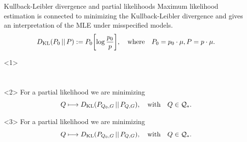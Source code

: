 \documentclass[smaller]{beamer}\usepackage{listings}
\begin{document}
\begin{frame}[label={sec:org1d43bb0}]{Kullback-Leibler divergence and partial likelihoods}
\small Maximum likelihood estimation is connected to minimizing the Kullback-Leibler
divergence and gives an interpretation of the MLE under misspecified models.
\begin{equation*}
  D_{\mathrm{KL}}(P_0 \, || \, P) := P_0
  {\left[
    \log \frac{p_0}{p}
  \right]},
  \quad \text{where} \quad
  P_0 = p_0 \cdot \mu,   P = p \cdot \mu.
\end{equation*}

\begin{onlyenv}<1>
\phantom{For a partial likelihood we are minimizing}
\begin{equation*}
 \phantom{  Q \longmapsto \KL(P_{Q_0,G} \, || \, P_{Q,G}), \quad \text{with} \quad Q \in \mathcal{Q}_*.}
\end{equation*}

\vfill

\end{onlyenv}

\begin{onlyenv}<2>
For a partial likelihood we are minimizing
\begin{equation*}
  Q \longmapsto D_{\mathrm{KL}}(P_{Q_0,G} \, || \, P_{Q,G}),
  \quad \text{with} \quad Q \in \mathcal{Q}_*.
\end{equation*}

\vfill

\end{onlyenv}

\begin{onlyenv}<3>
For a partial likelihood we are minimizing
\begin{equation*}
  Q \longmapsto D_{\mathrm{KL}}(P_{Q_0,G} \, || \, P_{Q,G}),
  \quad \text{with} \quad Q \in \mathcal{Q}_*.
\end{equation*}


\end{onlyenv}
\end{frame}
\end{document}
